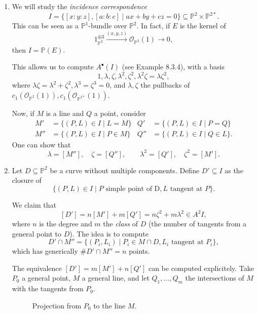 \documentclass[leqno, openany]{memoir}
\theoremstyle{definition}
\theoremstyle{remark}
\theoremstyle{plain}
\theoremstyle{definition}
\theoremstyle{remark}
\renewcommand{\P}{\mathbb{P}}
\newcommand{\mc}[1]{\mathcal{#1}}
\begin{document}
\begin{enumerate}
    \item We will study the \emph{incidence correspondence} 
\[ I=\{[x:y:z], [a:b:c] \mid ax+by+cz=0\} \subseteq \P^2 \times \P^{2\ast}. \]
This can be seen as a $\P^1$-bundle over $\P^2$. In fact, if $E$ is the kernel of
\[ 1_{\P^2}^{\oplus 3} \xrightarrow{(x, y, z)} \mc{O}_{\P^2}(1) \to 0, \]
then $I=\P(E)$. 

This allows us to compute $A^\bullet(I)$ (see Example 8.3.4), with a basis 
\[ 1, \lambda, \zeta, \lambda^2, \zeta^2, \lambda^2\zeta=\lambda\zeta^2, \]
where $\lambda\zeta=\lambda^2+\zeta^2, \lambda^3=\zeta^3=0$, and $\lambda, \zeta$ the pullbacks of $c_1(\mc{O}_{\P^2}(1)), c_1(\mc{O}_{\P^{2\ast}}(1))$. 

Now, if $M$ is a line and $Q$ a point, consider
\begin{align*}
M' &= \{(P, L) \in I \mid L=M\} & Q' &= \{(P, L) \in I \mid P=Q\} \\
M'' &= \{(P, L) \in I \mid P \in M\} & Q'' &= \{(P, L) \in I \mid Q \in L\}.
\end{align*}
One can show that
\[ \lambda=[M''], \quad \zeta = [Q''], \qquad \lambda^2=[Q'], \quad \zeta^2 = [M']. \]
    \item Let $D \subseteq \P^2$ be a curve without multiple components. Define $D' \subseteq I$ as the closure of
\[ \{(P, L) \in I \mid P \text{ simple point of D}, L \text{ tangent at }P\}. \]

We claim that
\[ [D'] = n[M']+m[Q'] = n\zeta^2+m \lambda^2 \in A^2I, \]
where $n$ is the degree and $m$ the \emph{class} of $D$ (the number of tangents from a general point to $D$). The idea is to compute 
\[ D' \cap M'' = \{(P_i, L_i) \mid P_i \in M \cap D, L_i \text{ tangent at }P_i\}, \]
which has generically $\# D' \cap M''=n$ points.  

The equivalence $[D']=m[M']+n[Q']$ can be computed explicitely. Take $P_0$ a general point, $M$ a general line, and let $Q_1, \dots, Q_m$ the intersections of $M$ with the tangents from $P_0$.
\begin{figure}[H]
\centering
{}
\caption{Projection from $P_0$ to the line $M$.}%
\label{fig:projection-to-line}
\end{figure}


\end{enumerate}
\end{document}
